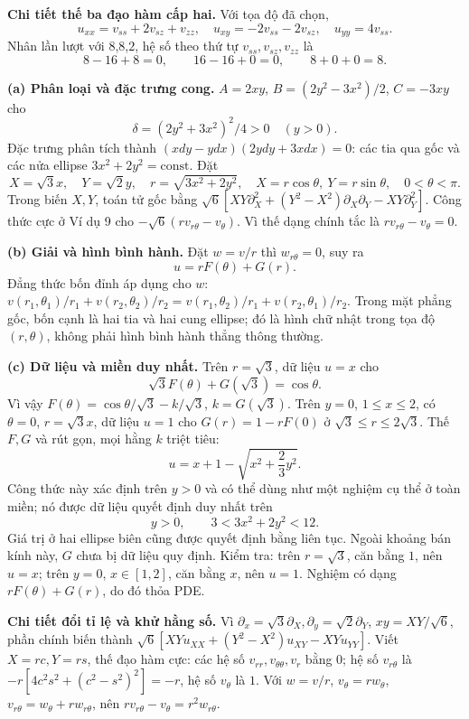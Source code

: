 \textbf{Chi tiết thế ba đạo hàm cấp hai.} Với tọa độ đã chọn,
\[u_{xx}=v_{ss}+2v_{sz}+v_{zz},\quad u_{xy}=-2v_{ss}-2v_{sz},\quad u_{yy}=4v_{ss}.\]
Nhân lần lượt với $8$,$8$,$2$, hệ số theo thứ tự $v_{ss},v_{sz},v_{zz}$ là
\[8-16+8=0,\qquad 16-16+0=0,\qquad 8+0+0=8.\]

\textbf{(a) Phân loại và đặc trưng cong.} $A=2xy$, $B=(2y^2-3x^2)/2$, $C=-3xy$ cho
\[\delta=(2y^2+3x^2)^2/4>0\quad(y>0).\]
Đặc trưng phân tích thành $(xdy-ydx)(2ydy+3xdx)=0$: các tia qua gốc và các nửa ellipse $3x^2+2y^2=\mathrm{const}$. Đặt
\[X=\sqrt3x,\quad Y=\sqrt2y,\quad r=\sqrt{3x^2+2y^2},\quad
X=r\cos\theta,\ Y=r\sin\theta,\quad0<\theta<\pi.\]
Trong biến $X,Y$, toán tử gốc bằng $\sqrt6[XY\partial_X^2+(Y^2-X^2)\partial_X\partial_Y-XY\partial_Y^2]$. Công thức cực ở Ví dụ 9 cho $-\sqrt6(r v_{r\theta}-v_\theta)$. Vì thế dạng chính tắc là $r v_{r\theta}-v_\theta=0$.

\textbf{(b) Giải và hình bình hành.} Đặt $w=v/r$ thì $w_{r\theta}=0$, suy ra
\[u=rF(\theta)+G(r).\]
Đẳng thức bốn đỉnh áp dụng cho $w$: $v(r_1,\theta_1)/r_1+v(r_2,\theta_2)/r_2=v(r_1,\theta_2)/r_1+v(r_2,\theta_1)/r_2$. Trong mặt phẳng gốc, bốn cạnh là hai tia và hai cung ellipse; đó là hình chữ nhật trong tọa độ $(r,\theta)$, không phải hình bình hành thẳng thông thường.

\textbf{(c) Dữ liệu và miền duy nhất.} Trên $r=\sqrt3$, dữ liệu $u=x$ cho
\[\sqrt3F(\theta)+G(\sqrt3)=\cos\theta.\]
Vì vậy $F(\theta)=\cos\theta/\sqrt3-k/\sqrt3$, $k=G(\sqrt3)$. Trên $y=0$, $1\le x\le2$, có $\theta=0$, $r=\sqrt3x$, dữ liệu $u=1$ cho $G(r)=1-rF(0)$ ở $\sqrt3\le r\le2\sqrt3$. Thế $F,G$ và rút gọn, mọi hằng $k$ triệt tiêu:
\[\boxed{u=x+1-\sqrt{x^2+\frac23y^2}.}\]
Công thức này xác định trên $y>0$ và có thể dùng như một nghiệm cụ thể ở toàn miền; nó được dữ liệu quyết định duy nhất trên
\[\boxed{y>0,\qquad3<3x^2+2y^2<12.}\]
Giá trị ở hai ellipse biên cũng được quyết định bằng liên tục. Ngoài khoảng bán kính này, $G$ chưa bị dữ liệu quy định. Kiểm tra: trên $r=\sqrt3$, căn bằng $1$, nên $u=x$; trên $y=0$, $x\in[1,2]$, căn bằng $x$, nên $u=1$. Nghiệm có dạng $rF(\theta)+G(r)$, do đó thỏa PDE.

\textbf{Chi tiết đổi tỉ lệ và khử hằng số.} Vì $\partial_x=\sqrt3\partial_X,\partial_y=\sqrt2\partial_Y$, $xy=XY/\sqrt6$, phần chính biến thành $\sqrt6[XYu_{XX}+(Y^2-X^2)u_{XY}-XYu_{YY}]$. Viết $X=rc,Y=rs$, thế đạo hàm cực: các hệ số $v_{rr},v_{\theta\theta},v_r$ bằng $0$; hệ số $v_{r\theta}$ là $-r[4c^2s^2+(c^2-s^2)^2]=-r$, hệ số $v_\theta$ là $1$. Với $w=v/r$, $v_\theta=rw_\theta$, $v_{r\theta}=w_\theta+rw_{r\theta}$, nên $rv_{r\theta}-v_\theta=r^2w_{r\theta}$.

